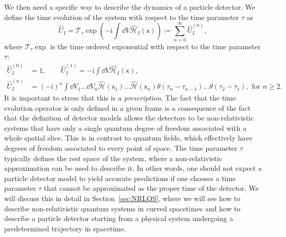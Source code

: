 \documentclass[letterpaper,12pt,titlepage,oneside,final]{book}
\newcommand{\openone}{\mathds{1}}
\newcommand{\mf}{\mathsf}%
\newcommand{\ii}{\mathrm{i}}
\begin{document}
We then need a specific way to describe the dynamics of a particle detector. We define the time evolution of the system with respect to the time parameter $\tau$ as
\begin{equation}
    \hat{U}_I = \mathcal{T}_\tau\exp(-\ii \int \dd V \hat{\mathcal{H}}_I(\mf x))\coloneqq \sum_{n=0}^\infty \hat{U}_I^{(n)},
\end{equation}
where $\mathcal{T}_\tau\exp$ is the time ordered exponential with respect to the time parameter $\tau$:
\begin{align}
    \hat{U}_I^{(0)} &= \openone,\quad\quad
    \hat{U}_I^{(1)} = - \ii \int \dd V \hat{\mathcal{H}}_I(\mf x),\\
    \hat{U}_I^{(n)} &= (-\ii)^n \int \dd V_1 ... \dd V_n \hat{\mathcal{H}}(\mf x_1)...\hat{\mathcal{H}}(\mf x_n) \theta(\tau_n - \tau_{n-1})...\theta(\tau_2 - \tau_{1}), \text{ for } n\geq 2.
\end{align}
It is important to stress that this is a \textit{prescription}. The fact that the time evolution operator is only defined in a given frame is a consequence of the fact that the definition of detector models allows the detectors to be non-relativistic systems that have only a single quantum degree of freedom associated with a whole spatial slice. This is in contrast to quantum fields, which effectively have degrees of freedom associated to every point of space. The time parameter $\tau$ typically defines the rest space of the system, where a non-relativistic approximation can be used to describe it. In other words, one should not expect a particle detector model to yield accurate predictions if one chooses a time parameter $\tau$ that cannot be approximated as the proper time of the detector. We will discuss this in detail in Section~\ref{sec:NRLQS}, where we will see how to describe non-relativistic quantum systems in curved spacetimes and how to describe a particle detector starting from a physical system undergoing a predetermined trajectory in spacetime.


\end{document}
